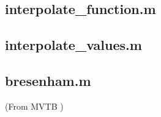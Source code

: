 \subsection{interpolate\_function.m}
\label{chap:MATLAB_interpolate_function}

\subsection{interpolate\_values.m}
\label{chap:MATLAB_interpolate_values}

\subsection{bresenham.m}
(From MVTB \cite{MVTB})
\label{chap:MATLAB_bresenham}

